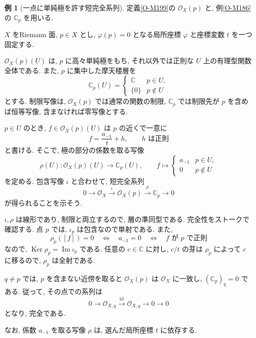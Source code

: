 \documentclass[dvipdfmx,a4paper,11pt]{article} %
\newcommand{\C}{\mathbb{C}}
\theoremstyle{definition}
\numberwithin{equation}{section}
\newtheorem{exa}[thm]{例}
\begin{document}
\begin{exa}[一点に単純極を許す短完全系列]\label{exa-simple-pole-sequence}
定義\ref{O-M199}の $\mathcal O_X(p)$ と, 例\ref{O-M186}の $\C_p$ を用いる.

$X$ をRiemann 面, $p\in X$ とし, 
$\varphi(p)=0$ となる局所座標 $\varphi$ と座標変数 $t$ を一つ固定する.

$\mathcal O_X(p)(U)$ は, $p$ に高々単純極をもち, 
それ以外では正則な $U$ 上の有理型関数全体である.
また, $p$ に集中した摩天楼層を
\[
\C_p(U)=
\begin{cases}
\C & p\in U,\\
\{0\} & p\notin U
\end{cases}
\]
とする.
制限写像は, $\mathcal O_X(p)$ では通常の関数の制限, 
$\C_p$ では制限先が $p$ を含めば恒等写像, 
含まなければ零写像とする.

$p\in U$ のとき, $f\in\mathcal O_X(p)(U)$ は
$p$ の近くで一意に
\[
f=\frac{a_{-1}}{t}+h,\qquad h\text{ は正則}
\]
と書ける.
そこで, 極の部分の係数を取る写像
\[
\rho(U):\mathcal O_X(p)(U)\longrightarrow\C_p(U),
\qquad
f\longmapsto
\begin{cases}
a_{-1} & p\in U,\\
0 & p\notin U
\end{cases}
\]
を定める.
包含写像 $\iota$ と合わせて, 短完全系列
\[
0\longrightarrow\mathcal O_X
\xrightarrow{\iota}\mathcal O_X(p)
\xrightarrow{\rho}\C_p
\longrightarrow0
\]
が得られることを示そう. 

$\iota,\rho$ は線形であり, 制限と両立するので, 
層の準同型である.
完全性をストークで確認する.
点 $p$ では, $\iota_p$ は包含なので単射である.
また, 
\[
\rho_p([f])=0
\quad\Longleftrightarrow\quad
a_{-1}=0
\quad\Longleftrightarrow\quad
f\text{ が }p\text{ で正則}
\]
なので, $\operatorname{Ker}\rho_p=\operatorname{Im}\iota_p$ である.
任意の $c\in\C$ に対し, $c/t$ の芽は $\rho_p$ によって
$c$ に移るので, $\rho_p$ は全射である.

$q\neq p$ では, $p$ を含まない近傍を取ると
$\mathcal O_X(p)$ は $\mathcal O_X$ に一致し, 
$(\C_p)_q=0$ である.
従って, その点での系列は
\[
0\longrightarrow\mathcal O_{X,q}
\xrightarrow{\mathrm{id}}\mathcal O_{X,q}
\longrightarrow0\longrightarrow0
\]
となり, 完全である.
\end{exa}

なお, 係数 $a_{-1}$ を取る写像 $\rho$ は, 
選んだ局所座標 $t$ に依存する.
\end{document}
